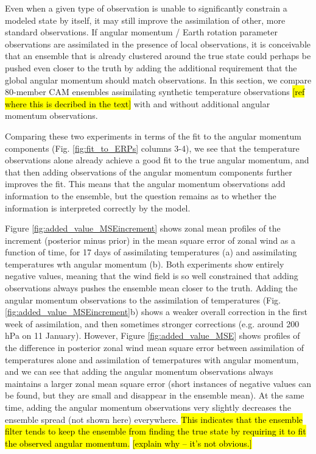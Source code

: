 Even when a given type of observation is unable to significantly constrain a modeled state by itself, it may still improve the assimilation of other, more standard observations.  
If angular momentum / Earth rotation parameter observations are assimilated in the presence of local observations, it is conceivable that an ensemble that is already clustered around the true state could perhaps be pushed even closer to the truth by adding the additional requirement that the global angular momentum should match observations. 
In this section, we compare 80-member CAM ensembles assimilating synthetic temperature observations \hl{[ref where this is decribed in the text]}  with and without additional angular momentum observations.

Comparing these two experiments in terms of the fit to the angular momentum components (Fig. \ref{fig:fit_to_ERPs} columns 3-4), we see that the temperature observations alone already achieve a good fit to the true angular momentum, and that 
then adding observations of the angular momentum components further improves the fit.  
This means that the angular momentum observations add information to the ensemble, but the question remains as to whether the information is interpreted correctly by the model.

Figure \ref{fig:added_value_MSEincrement} shows zonal mean profiles of the increment (posterior minus prior) in the mean square error of zonal wind as a function of time, for 17 days of assimilating temperatures (a) and assimilating temperatures wth angular momentum (b).  
Both experiments show entirely negative values, meaning that the wind field is so well constrained that adding observations always pushes the ensemble mean closer to the truth. 
Adding the angular momentum observations to the assimilation of temperatures (Fig. \ref{fig:added_value_MSEincrement}b) shows a weaker overall correction in the first week of assimilation, and then sometimes stronger corrections (e.g. around 200 hPa on 11 January). 
However, 
Figure \ref{fig:added_value_MSE} shows profiles of the difference in posterior zonal wind mean square error between assimilation of temperatures alone and assimilation of temerpatures with angular momentum, and we can see that 
adding the angular momentum observations always maintains a larger zonal mean square error (short instances of negative values can be found, but they are small and disappear in the ensemble mean). 
At the same time, adding the angular momentum observations very slightly decreases the ensemble spread (not shown here) everywhere.  
\hl{This indicates that the ensemble filter tends to keep the ensemble from finding the true state by requiring it to fit the observed angular momentum.}  
\hl{[explain why -- it's not obvious.]}
